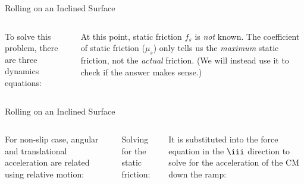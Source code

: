 \documentclass[12pt,compress,aspectratio=169]{beamer}
\begin{document}
\begin{frame}{Rolling on an Inclined Surface}
  \begin{columns}
    

    To solve this problem, there are three dynamics equations:

    
    At this point, static friction $f_s$ is \emph{not} known. The coefficient
    of static friction ($\mu_s$) only tells us the \emph{maximum} static
    friction, not the \emph{actual} friction. (We will instead use it to check
    if the answer makes sense.)
  \end{columns}
\end{frame}



\begin{frame}{Rolling on an Inclined Surface}
  \begin{columns}
    

    For non-slip case, angular and translational acceleration are related using
    relative motion:

    
    \vspace{-.22in}Solving for the static friction:


    \vspace{-.1in}It is substituted into the force equation in the $\iii$
    direction to solve for the acceleration of the CM down the ramp:

  \end{columns}
\end{frame}
\end{document}
